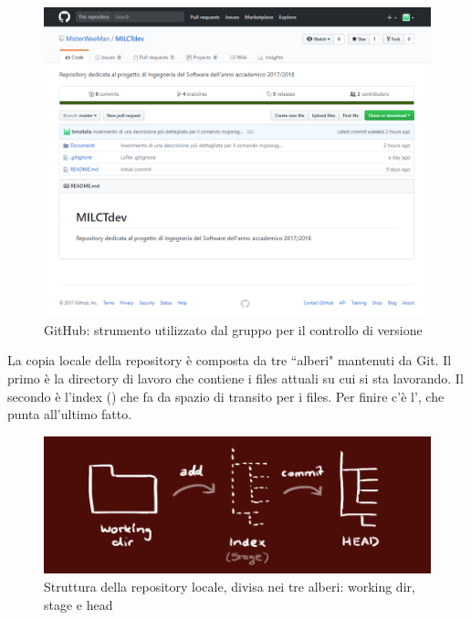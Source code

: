                 \begin{figure}[htbp]
                    \centering
                    \includegraphics[height=9cm]{./img/gitHub.png}
                    \caption[GitHub]{GitHub: strumento  utilizzato dal gruppo per il controllo di versione}
                \end{figure}


                La copia locale della repository è composta da tre ``alberi" mantenuti da Git.
                Il primo è la directory di lavoro che contiene i files attuali su cui si sta lavorando.
                Il secondo è l'index () che fa da spazio di transito per i files.
                Per finire c'è l', che punta all'ultimo  fatto.

                    \begin{figure}[htbp]
                        \centering
                        \includegraphics[scale=0.4]{./img/trees.png}
                        \caption[Struttura repository locale]{Struttura della repository locale, divisa nei tre alberi: working dir, stage e head}
                    \end{figure}

